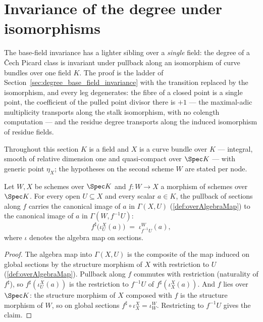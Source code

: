\section{Invariance of the degree under isomorphisms}
\label{sec:degree_iso_invariance}

The base-field invariance has a lighter sibling over a \emph{single} field: the degree
of a \v Cech Picard class is invariant under pullback along an isomorphism of curve
bundles over one field \(K\). The proof is the ladder of
Section~\ref{sec:degree_base_field_invariance} with the transition replaced by the
isomorphism, and every leg degenerates: the fibre of a closed point is a single point,
the coefficient of the pulled point divisor there is \(+1\) --- the maximal-adic
multiplicity transports along the stalk isomorphism, with no colength computation ---
and the residue degree transports along the induced isomorphism of residue fields.

Throughout this section \(K\) is a field and \(X\) is a curve bundle over \(K\) ---
integral, smooth of relative dimension one and quasi-compact over \(\Spec K\) --- with
generic point \(\eta_X\); the hypotheses on the second scheme \(W\) are stated per
node.

\begin{lemma}
  \label{lem:overAlgebraMap_app}
  \leanok
  Let \(W, X\) be schemes over \(\Spec K\) and \(f : W \to X\) a morphism of schemes
  over \(\Spec K\). For every open \(U \subseteq X\) and every scalar \(a \in K\), the
  pullback of sections along \(f\) carries the canonical image of \(a\) in
  \(\Gamma(X, U)\) (\ref{def:overAlgebraMap}) to the canonical image of \(a\) in
  \(\Gamma(W, f^{-1}U)\):
  \[
    f^{\sharp}\bigl(\iota^{X}_{U}(a)\bigr) \;=\; \iota^{W}_{f^{-1}U}(a),
  \]
  where \(\iota\) denotes the algebra map on sections.
\end{lemma}
\begin{proof}
  \leanok
  The algebra map into \(\Gamma(X, U)\) is the composite of the map induced on global
  sections by the structure morphism of \(X\) with restriction to \(U\)
  (\ref{def:overAlgebraMap}). Pullback along \(f\) commutes with restriction
  (naturality of \(f^{\sharp}\)), so \(f^{\sharp}(\iota^{X}_{U}(a))\) is the
  restriction to \(f^{-1}U\) of \(f^{\sharp}(\iota^{X}_{X}(a))\). And \(f\) lies over
  \(\Spec K\): the structure morphism of \(X\) composed with \(f\) is the structure
  morphism of \(W\), so on global sections \(f^{\sharp} \circ \iota^{X}_{X} =
  \iota^{W}_{W}\). Restricting to \(f^{-1}U\) gives the claim.
\end{proof}


